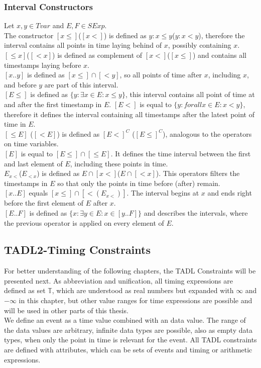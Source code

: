 	\subsubsection{Interval Constructors}
		Let $x, y\in Tvar$ and $E, F\in SExp$.\\
		The constructor $[x\leq]$($[x<]$) is defined as ${y: x \leq y}$(${y: x < y}$), therefore the interval contains all points in time laying behind of $x$, possibly containing $x$.\\
		$[\leq x]$($[< x]$) is defined as complement of $[x<]$($[x\leq]$) and contains all timestamps laying before $x$.\\
		$[x..y]$ is defined as $[x\leq]\cap[<y]$, so all points of time after $x$, including $x$, and before $y$ are part of this interval.\\
		$[E \leq]$ is defined as $\{y : \exists x \in E : x \leq y\}$, this interval contains all point of time at and after the first timestamp in $E$. $[E<]$ is equal to $\{y : forall x \in E : x < y\}$, therefore it defines the interval containing all timestamps after the latest point of time in $E$.\\
		$[\leq E]$ ($[< E]$) is defined as $[E<]^C$ ($[E\leq]^C$), analogous to the operators on time variables.\\
		$[E]$ is equal to $[E\leq]\cap[\leq E]$. It defines the time interval between the first and last element of $E$, including these points in time.\\
		$E_{x<}$($E_{<x}$) is defined as $E\cap [x<]$($E\cap [<x]$). This operators filters the timestamps in $E$ so that only the points in time before (after) remain.\\
		$[x..E]$ equals $[x\leq]\cap[<(E_{x<})]$. The interval begins at $x$ and ends right before the first element of $E$ after $x$.\\
		$[E..F]$ is defined as $\{x:\exists y\in E:x\in[y..F]\}$ and describes the intervals, where the previous operator is applied on every element of $E$.\\
\subsection{TADL2-Timing Constraints}
	For better understanding of the following chapters, the TADL Constraints will be presented next. As abbreviation and unification, all timing expressions are defined as set $\mathbb{T}$, which are understood as real numbers but expanded with $\infty$ and $-\infty$ in this chapter, but other value ranges for time expressions are possible and will be used in other parts of this thesis.\\
	We define an event as a time value combined with an data value. The range of the data values are arbitrary, infinite data types are possible, also as empty data types, when only the point in time is relevant for the event. All TADL constraints are defined with attributes, which can be sets of events and timing or arithmetic expressions.

